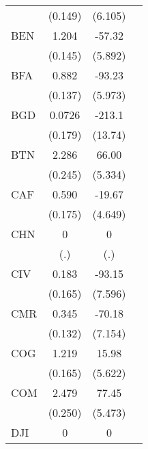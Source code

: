 \begin{table}[htbp]
\begin{tabular}{l*{3}{c}}
                &  (0.149)         &  (6.105)         &                  \\
\addlinespace
BEN             &    1.204\sym{***}&   -57.32\sym{***}&                  \\
                &  (0.145)         &  (5.892)         &                  \\
\addlinespace
BFA             &    0.882\sym{***}&   -93.23\sym{***}&                  \\
                &  (0.137)         &  (5.973)         &                  \\
\addlinespace
BGD             &   0.0726         &   -213.1\sym{***}&                  \\
                &  (0.179)         &  (13.74)         &                  \\
\addlinespace
BTN             &    2.286\sym{***}&    66.00\sym{***}&                  \\
                &  (0.245)         &  (5.334)         &                  \\
\addlinespace
CAF             &    0.590\sym{***}&   -19.67\sym{***}&                  \\
                &  (0.175)         &  (4.649)         &                  \\
\addlinespace
CHN             &        0         &        0         &                  \\
                &      (.)         &      (.)         &                  \\
\addlinespace
CIV             &    0.183         &   -93.15\sym{***}&                  \\
                &  (0.165)         &  (7.596)         &                  \\
\addlinespace
CMR             &    0.345\sym{**} &   -70.18\sym{***}&                  \\
                &  (0.132)         &  (7.154)         &                  \\
\addlinespace
COG             &    1.219\sym{***}&    15.98\sym{**} &                  \\
                &  (0.165)         &  (5.622)         &                  \\
\addlinespace
COM             &    2.479\sym{***}&    77.45\sym{***}&                  \\
                &  (0.250)         &  (5.473)         &                  \\
\addlinespace
DJI             &        0         &        0         &                  \\

\end{tabular}
\end{table}
